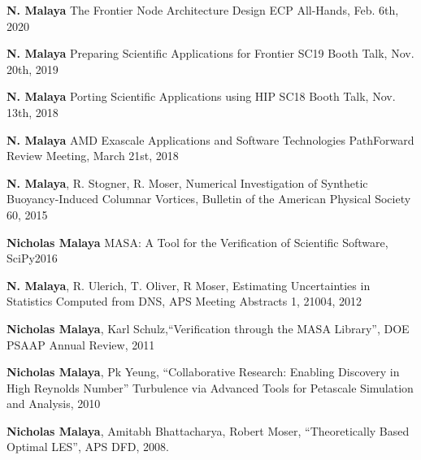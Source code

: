 
\textbf{N. Malaya}
The Frontier Node Architecture Design
ECP All-Hands, Feb. 6th, 2020

\textbf{N. Malaya}
Preparing Scientific Applications for Frontier
SC19 Booth Talk, Nov. 20th, 2019

\textbf{N. Malaya}
Porting Scientific Applications using HIP
SC18 Booth Talk, Nov. 13th, 2018

\blankline

\textbf{N. Malaya}
AMD Exascale Applications and Software Technologies
PathForward Review Meeting, March 21st, 2018

\blankline

\textbf{N. Malaya}, R. Stogner, R. Moser,
Numerical Investigation of Synthetic Buoyancy-Induced Columnar Vortices,
Bulletin of the American Physical Society 60, 2015

\blankline

\textbf{Nicholas Malaya}
MASA: A Tool for the Verification of Scientific Software, SciPy2016
\blankline

\textbf{N. Malaya}, R. Ulerich, T. Oliver, R Moser, Estimating Uncertainties in
Statistics Computed from DNS, APS Meeting Abstracts 1, 21004, 2012 

\blankline

\textbf{Nicholas Malaya}, Karl Schulz,``Verification through the MASA Library'', DOE
PSAAP Annual Review, 2011

\blankline

\textbf{Nicholas Malaya},  Pk Yeung, ``Collaborative Research: Enabling Discovery in High Reynolds Number''
Turbulence via Advanced Tools for Petascale Simulation and Analysis, 2010

\blankline

\textbf{Nicholas Malaya}, Amitabh Bhattacharya, Robert Moser,
``Theoretically Based Optimal LES'', APS DFD, 2008.

